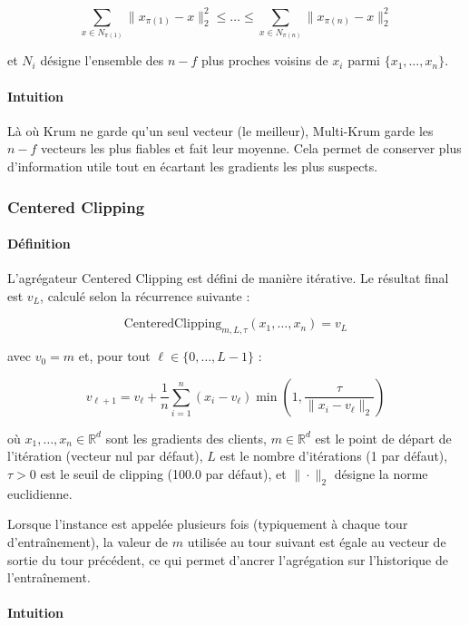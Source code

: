 \documentclass[a4paper,11pt]{article}
\begin{document}
\[
\sum_{x \in N_{\pi(1)}} \|x_{\pi(1)} - x\|_2^2 \leq \dots \leq \sum_{x \in N_{\pi(n)}} \|x_{\pi(n)} - x\|_2^2
\]

et $N_i$ désigne l'ensemble des $n-f$ plus proches voisins de $x_i$ parmi $\{x_1,\dots,x_n\}$.

\paragraph{Intuition}

Là où Krum ne garde qu'un seul vecteur (le meilleur), Multi-Krum garde les $n-f$ vecteurs les plus fiables et fait leur moyenne. Cela permet de conserver plus d'information utile tout en écartant les gradients les plus suspects.

\subsubsection{Centered Clipping}

\paragraph{Définition}

L'agrégateur Centered Clipping est défini de manière itérative. Le résultat final est $v_L$, calculé selon la récurrence suivante :

\[
\mathrm{CenteredClipping}_{m,L,\tau}(x_1,\dots,x_n) = v_L
\]

avec $v_0 = m$ et, pour tout $\ell \in \{0,\dots,L-1\}$ :

\[
v_{\ell+1} = v_{\ell} + \frac{1}{n}\sum_{i=1}^{n}(x_i - v_\ell)\min\!\left(1,\frac{\tau}{\|x_i - v_\ell\|_2}\right)
\]

où $x_1,\dots,x_n \in \mathbb{R}^d$ sont les gradients des clients, $m \in \mathbb{R}^d$ est le point de départ de l'itération (vecteur nul par défaut), $L$ est le nombre d'itérations (1 par défaut), $\tau > 0$ est le seuil de clipping (100.0 par défaut), et $\|\cdot\|_2$ désigne la norme euclidienne.

Lorsque l'instance est appelée plusieurs fois (typiquement à chaque tour d'entraînement), la valeur de $m$ utilisée au tour suivant est égale au vecteur de sortie du tour précédent, ce qui permet d'ancrer l'agrégation sur l'historique de l'entraînement.

\paragraph{Intuition}
\end{document}
